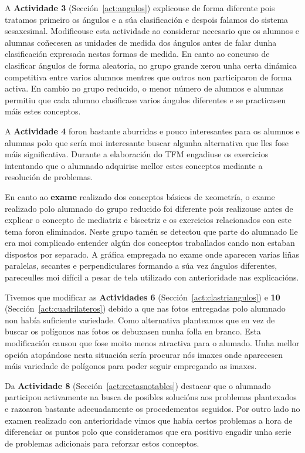 A \textbf{Actividade 3} (Sección~\ref{act:angulos}) explicouse de forma diferente pois tratamos primeiro os ángulos e a súa clasificación e despois falamos do sistema sesaxesimal. Modificouse esta actividade ao considerar necesario que os alumnos e alumnas coñecesen as unidades de medida dos ángulos antes de falar dunha clasificación expresada nestas formas de medida. En canto ao concurso de clasificar ángulos de forma aleatoria, no grupo grande xerou unha certa dinámica competitiva entre varios alumnos mentres que outros non participaron de forma activa. En cambio no grupo reducido, o menor número de alumnos e alumnas permitiu que cada alumno clasificase varios ángulos diferentes e se practicasen máis estes conceptos.

A \textbf{Actividade 4} foron bastante aburridas e pouco interesantes para os alumnos e alumnas polo que sería moi interesante buscar algunha alternativa que lles fose máis significativa. Durante a elaboración do TFM engadiuse os exercicios intentando que o alumnado adquirise mellor estes conceptos mediante a resolución de problemas.

En canto ao \textbf{exame} realizado dos conceptos básicos de xeometría, o exame realizado polo alumnado do grupo reducido foi diferente pois realizouse antes de explicar o concepto de mediatriz e bisectriz e os exercicios relacionados con este tema foron eliminados. Neste grupo tamén se detectou que parte do alumnado lle era moi complicado entender algún dos conceptos traballados cando non estaban dispostos por separado. A gráfica empregada no exame onde aparecen varias liñas paralelas, secantes e perpendiculares formando a súa vez ángulos diferentes, pareceulles moi difícil a pesar de tela utilizado con anterioridade nas explicacións.

Tivemos que modificar as \textbf{Actividades 6} (Sección~\ref{act:clastriangulos}) e \textbf{10} (Sección~\ref{act:cuadrilateros}) debido a que nas fotos entregadas polo alumnado non había suficiente variedade. Como alternativa planteamos que en vez de buscar os polígonos nas fotos os debuxasen nunha folla en branco. Esta modificación causou que fose moito menos atractiva para o alumado. Unha mellor opción atopándose nesta situación sería procurar nós imaxes onde aparecesen máis variedade de polígonos para poder seguir empregando as imaxes.

Da \textbf{Actividade 8} (Sección~\ref{act:rectasnotables}) destacar que o alumnado participou activamente na busca de posibles solucións aos problemas plantexados e razoaron bastante adecuadamente os procedementos seguidos. Por outro lado no examen realizado con anterioridade vimos que había certos problemas a hora de diferenciar os puntos polo que consideramos que era positivo engadir unha serie de problemas adicionais para reforzar estos conceptos.

